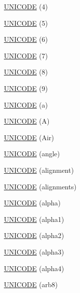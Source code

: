 \begin{DoxyCompactItemize}
\item 
\hyperlink{namespace_d_d4hep_1_1_x_m_l_a1990be78ed2696089312b3cd52bc4dd4}{U\+N\+I\+C\+O\+DE} (4)
\item 
\hyperlink{namespace_d_d4hep_1_1_x_m_l_aa8f833eda6fb5edc3992b3109fc1b145}{U\+N\+I\+C\+O\+DE} (5)
\item 
\hyperlink{namespace_d_d4hep_1_1_x_m_l_af3571205d99e9d532fe59a9f7e19cf57}{U\+N\+I\+C\+O\+DE} (6)
\item 
\hyperlink{namespace_d_d4hep_1_1_x_m_l_a430f87ed011c9770e7d86864400da3da}{U\+N\+I\+C\+O\+DE} (7)
\item 
\hyperlink{namespace_d_d4hep_1_1_x_m_l_a3347b57d8b9725a7217c6abdd0308e71}{U\+N\+I\+C\+O\+DE} (8)
\item 
\hyperlink{namespace_d_d4hep_1_1_x_m_l_ae550de39cafa7593714714ca943f1858}{U\+N\+I\+C\+O\+DE} (9)
\item 
\hyperlink{namespace_d_d4hep_1_1_x_m_l_a553ed9b509e8bd593926ce6484ecdd05}{U\+N\+I\+C\+O\+DE} (a)
\item 
\hyperlink{namespace_d_d4hep_1_1_x_m_l_a20b3d3faff6f8f430e3e5c48caa5d3db}{U\+N\+I\+C\+O\+DE} (A)
\item 
\hyperlink{namespace_d_d4hep_1_1_x_m_l_ab9b807e7f300a5d5324987d2cca9d263}{U\+N\+I\+C\+O\+DE} (Air)
\item 
\hyperlink{namespace_d_d4hep_1_1_x_m_l_a22a6c19b702f13e58f4a63a727d32849}{U\+N\+I\+C\+O\+DE} (angle)
\item 
\hyperlink{namespace_d_d4hep_1_1_x_m_l_a52168ebcf9545281b946c598ad4180ee}{U\+N\+I\+C\+O\+DE} (alignment)
\item 
\hyperlink{namespace_d_d4hep_1_1_x_m_l_aac909b2858fd820598354e815fd279c2}{U\+N\+I\+C\+O\+DE} (alignments)
\item 
\hyperlink{namespace_d_d4hep_1_1_x_m_l_abf34ee32f0539390de87a55bcbe2e4c4}{U\+N\+I\+C\+O\+DE} (alpha)
\item 
\hyperlink{namespace_d_d4hep_1_1_x_m_l_a46c200f593aae803a62c13a83caa68b1}{U\+N\+I\+C\+O\+DE} (alpha1)
\item 
\hyperlink{namespace_d_d4hep_1_1_x_m_l_affcc9652d1dbabc8c0b5a16d35bbdacd}{U\+N\+I\+C\+O\+DE} (alpha2)
\item 
\hyperlink{namespace_d_d4hep_1_1_x_m_l_a04ceb3c6699839d48a368368fccc7750}{U\+N\+I\+C\+O\+DE} (alpha3)
\item 
\hyperlink{namespace_d_d4hep_1_1_x_m_l_a55510c7bcf274d9165301c7608b8e00e}{U\+N\+I\+C\+O\+DE} (alpha4)
\item 
\hyperlink{namespace_d_d4hep_1_1_x_m_l_a74f70cb05e26ef0264f4412a7c947b7b}{U\+N\+I\+C\+O\+DE} (arb8)

\end{DoxyCompactItemize}
